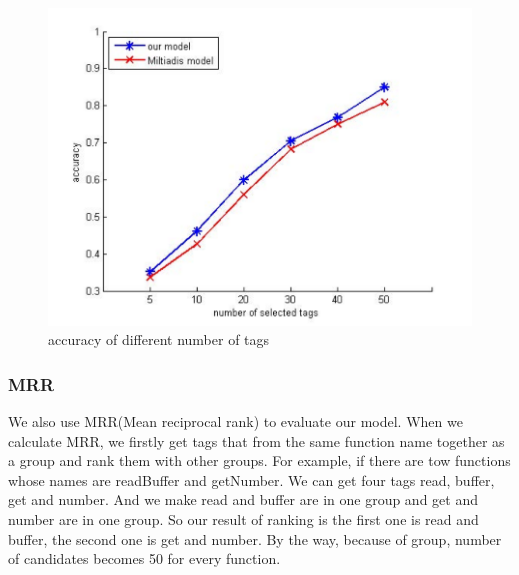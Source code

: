 \begin{figure}[!htp]
 \centering
 \includegraphics[width=\linewidth]{img/accuracy2.pdf}
 \caption{accuracy of different number of tags}
\end{figure}

\subsubsection{MRR}
We also use MRR(Mean reciprocal rank) to evaluate our model. When we calculate MRR, we firstly get tags that from the same function name together as a group and rank them with other groups. For example, if there are tow functions whose names are readBuffer and getNumber. We can get four tags read, buffer, get and number. And we make read and buffer are in one group and get and number are in one group. So our result of ranking is the first one is read and buffer, the second one is get and number. By the way, because of group, number of candidates becomes 50 for every function.

